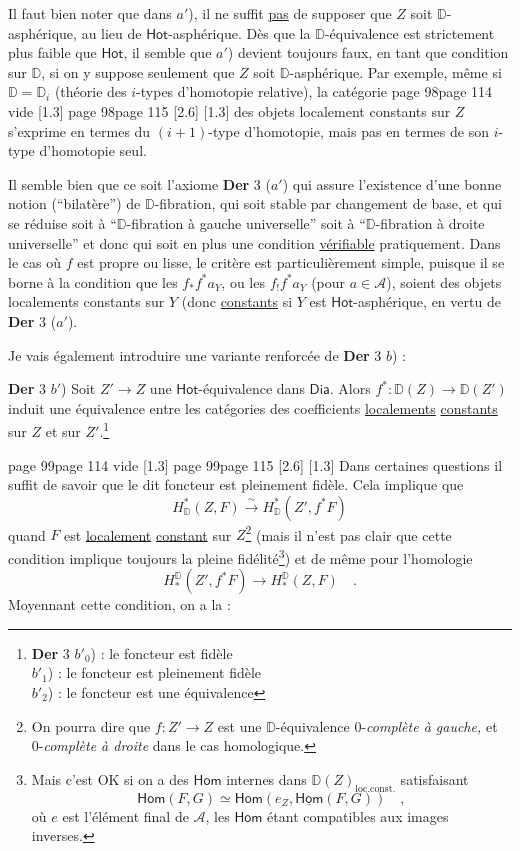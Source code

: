 \documentclass[11pt,leqno]{article}
\newcommand{\printedpage}[1]{\marginnote{\scriptsize\sffamily ed.\ #1}}
\newcommand{\msp}[1]{%
  \begingroup\def\thismsp{#1}\def\blankmsp{page 114 vide}%
  \ifx\thismsp\blankmsp
    \marginnote{\scriptsize\sffamily [114: vide]}[1.3\baselineskip]%
  \else\def\followingmsp{page 115}%
    \ifx\thismsp\followingmsp
      \marginnote{\scriptsize\sffamily [page 115]}[2.6\baselineskip]%
    \else\marginnote{\scriptsize\sffamily [#1]}[1.3\baselineskip]\fi
  \fi\endgroup}
\newcommand{\DD}{\ensuremath{\mathbb{D}}}
\newcommand{\Dia}{\ensuremath{\mathsf{Dia}}}
\newcommand{\Hom}{\ensuremath{\mathsf{Hom}}}
\newcommand{\Hot}{\ensuremath{\mathsf{Hot}}}
\begin{document}
Il faut bien noter que dans $a'$), il ne suffit \underline{pas} de supposer que $Z$ soit $\DD$-asphérique, au lieu de \Hot-asphérique. Dès que la $\DD$-équivalence est strictement plus faible que \Hot, il semble que $a'$) devient toujours faux, en tant que condition sur $\DD$, si on y suppose seulement que $Z$ soit $\DD$-asphérique. Par exemple, même si $\DD = \DD_i$ (théorie des $i$-types d’homotopie relative), la catégorie
\msp{page 98}
des objets localement constants sur $Z$ s’exprime en termes du $(i+1)$-type d’homotopie, mais pas en termes de son $i$-type d’homotopie seul.

Il semble bien que ce soit l’axiome \textbf{Der} 3 ($a'$) qui assure l’existence d’une bonne notion (“bilatère”) de $\DD$-fibration, qui soit stable par changement de base, et qui se réduise soit
\printedpage{60}
à “$\DD$-fibration à gauche universelle” soit à “$\DD$-fibration à droite universelle” et donc qui soit en plus une condition \underline{vérifiable} pratiquement. Dans le cas où $f$ est propre ou lisse, le critère est particulièrement simple, puisque il se borne à la condition que les $f_* f^* a_Y$, ou les $f_! f^* a_Y$ (pour $a \in \mathcal{A}$), soient des objets localements constants sur $Y$ (donc \underline{constants} si $Y$ est \underline{\underline{\Hot}}-asphérique, en vertu de \textbf{Der} 3 ($a'$). %

Je vais également introduire une variante renforcée de \textbf{Der} 3 $b$) :

\textbf{Der} 3 $b'$) Soit $Z' \to Z$ une \Hot-équivalence dans \Dia. Alors $f^* : \DD(Z) \to \DD(Z')$ induit une équivalence entre les catégories des coefficients \underline{localements} \underline{constants} sur $Z$ et sur $Z'$.\footnote[50]{\textbf{Der} 3 $b'_0$) : le foncteur est fidèle\\
\hspace*{6em}$b'_1$) : le foncteur est pleinement fidèle\\
\hspace*{6em}$b'_2$) : le foncteur est une équivalence} %

\msp{page 99}
Dans certaines questions il suffit de savoir que le dit foncteur est pleinement fidèle. Cela implique que
\[
H^*_{\DD}(Z,F) \overset{\sim}{\longrightarrow} H^*_{\DD}(Z', f^*F)
\]
quand $F$ est \underline{localement} \underline{constant} sur $Z$\footnote[51]{On pourra dire que $f : Z' \to Z$ est une $\DD$-équivalence 0-\textit{complète à gauche,} et 0-\textit{complète à droite} dans le cas homologique.} (mais il n’est pas clair que cette condition implique toujours la pleine fidélité\footnote[52]{Mais c’est OK si on a des \underline{\Hom} internes dans $\DD(Z)_{\mathrm{loc.const.}}$ satisfaisant
\[
\Hom(F,G) \simeq \Hom(e_Z, \underline{\Hom}(F,G)) \quad ,
\]
où $e$ est l’élément final de $\mathcal{A}$, les \underline{\Hom} étant compatibles aux images inverses.}) et de même pour l’homologie
\[
H_*^{\DD}(Z', f^*F) \longrightarrow H_*^{\DD}(Z,F) \quad .
\]
Moyennant cette condition, on a la :
\end{document}
